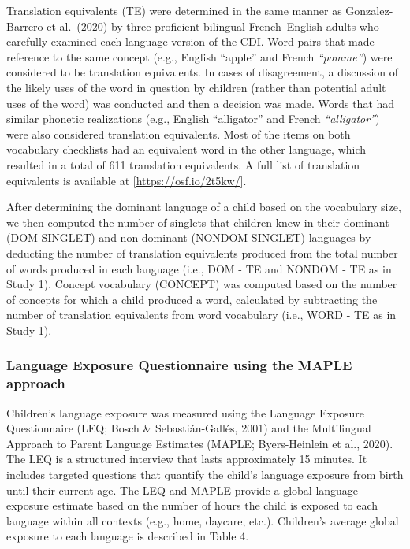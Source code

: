 \documentclass[
  english,
  ,man,floatsintext]{apa6}
\begin{document}
Translation equivalents (TE) were determined in the same manner as Gonzalez-Barrero et al.~(2020) by three proficient bilingual French--English adults who carefully examined each language version of the CDI. Word pairs that made reference to the same concept (e.g., English ``apple'' and French \emph{``pomme''}) were considered to be translation equivalents. In cases of disagreement, a discussion of the likely uses of the word in question by children (rather than potential adult uses of the word) was conducted and then a decision was made. Words that had similar phonetic realizations (e.g., English ``alligator'' and French \emph{``alligator''}) were also considered translation equivalents. Most of the items on both vocabulary checklists had an equivalent word in the other language, which resulted in a total of 611 translation equivalents. A full list of translation equivalents is available at {[}\url{https://osf.io/2t5kw/}{]}.

After determining the dominant language of a child based on the vocabulary size, we then computed the number of singlets that children knew in their dominant (DOM-SINGLET) and non-dominant (NONDOM-SINGLET) languages by deducting the number of translation equivalents produced from the total number of words produced in each language (i.e., DOM - TE and NONDOM - TE as in Study 1). Concept vocabulary (CONCEPT) was computed based on the number of concepts for which a child produced a word, calculated by subtracting the number of translation equivalents from word vocabulary (i.e., WORD - TE as in Study 1).

\hypertarget{language-exposure-questionnaire-using-the-maple-approach}{%
\subsubsection{Language Exposure Questionnaire using the MAPLE approach}\label{language-exposure-questionnaire-using-the-maple-approach}}

Children's language exposure was measured using the Language Exposure Questionnaire (LEQ; Bosch \& Sebastián-Gallés, 2001) and the Multilingual Approach to Parent Language Estimates (MAPLE; Byers-Heinlein et al., 2020). The LEQ is a structured interview that lasts approximately 15 minutes. It includes targeted questions that quantify the child's language exposure from birth until their current age. The LEQ and MAPLE provide a global language exposure estimate based on the number of hours the child is exposed to each language within all contexts (e.g., home, daycare, etc.). Children's average global exposure to each language is described in Table 4.
\end{document}

